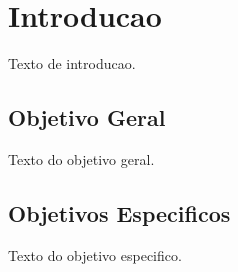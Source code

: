 \documentclass[a4paper]{article}
\begin{document}
\tableofcontents

\section{Introducao} %
Texto de introducao.

\subsection{Objetivo Geral}	%
Texto do objetivo geral.

\subsection{Objetivos Especificos}	%
Texto do objetivo especifico.
\end{document}
